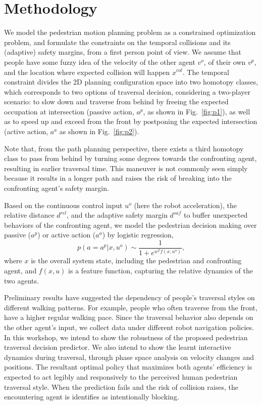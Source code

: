 \documentclass[conference]{IEEEtran}
\begin{document}
\section{Methodology}
We model the pedestrian motion planning problem as a constrained optimization 
problem, and formulate the constraints on the temporal collisions and its 
(adaptive) safety margins, from a first person point of view. We assume that 
people have some fuzzy idea of the velocity of the other agent $v^o$, of their 
own $v^p$, and the location where expected collision will happen $x^{col}$. 
The temporal constraint divides the 2D planning configuration space into two 
homotopy classes, which corresponds to two options of traversal decision, 
considering a two-player scenario: to slow down and traverse from behind by 
freeing the expected occupation at intersection (passive action, $a^{p}$, as 
shown in Fig.~\ref{fig:p1}), as well as to speed up and exceed from the front by postponing 
the expected intersection (active action, $a^a$ as shown in Fig.~\ref{fig:p2}).   

Note that, from the path planning perspective, there exists a third homotopy class to pass from behind by turning some degrees towards the confronting agent, resulting in earlier traversal time. This maneuver is not commonly seen simply because it results in a longer path and raises the risk of breaking into the confronting agent's safety margin. 

Based on the continuous control input $u^o$ (here the robot acceleration), the 
relative distance $d^{rel}$, and the adaptive safety margin $d^{saf}$ to 
buffer unexpected behaviors of the confronting agent, we model the pedestrian 
decision making over passive ($a^p$) or active action ($a^a$) by logistic regression,
\begin{equation}
p(a=a^p|x,u^o) \sim \frac{1}{1+e^{w^Tf(x,u^o)}}, 
\end{equation}
where $x$ is the overall system state, including the pedestrian and confronting agent, and $f(x,u)$ is a feature function, capturing the relative dynamics of the two agents.

Preliminary results have suggested the dependency of people's traversal styles 
on different walking patterns. For example, people who often traverse from 
the front, have a higher regular walking pace. Since the traversal 
behavior also depends on the other agent's input, we collect data under 
different robot navigation policies. In this workshop, we intend to show the 
robustness of the proposed pedestrian traversal decision predictor. We also 
intend to show the learnt interactive dynamics during traversal, through phase 
space analysis on velocity changes and positions. The resultant optimal 
policy that maximizes both agents' efficiency is expected to act legibly 
and responsively to the perceived human pedestrian traversal style. When the 
prediction fails and the risk of collision raises, the encountering agent is 
identifies as intentionally blocking.

{\footnotesize


}
\end{document}
